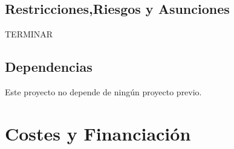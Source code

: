 \documentclass[
	a4paper, %
	12pt, %
]{CSSullivanBusinessReport}
\begin{document}
\begin{fullwidth}
\subsection{Restricciones,Riesgos y Asunciones}
TERMINAR 



\subsection{Dependencias}
Este proyecto no depende de ningún proyecto previo.

\end{fullwidth}
\section{Costes y Financiación}

\end{document}
